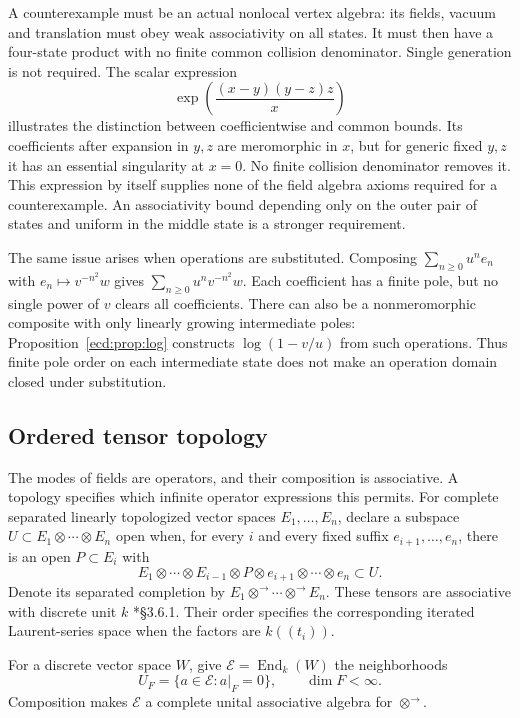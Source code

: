 A counterexample must be an actual nonlocal vertex
algebra: its fields, vacuum and translation must obey
weak associativity on all states. It must then have
a four-state product with no finite common collision
denominator. Single generation is not required.
The scalar expression
\[
 \exp\left(\frac{(x-y)(y-z)z}{x}\right)
\]
illustrates the distinction between coefficientwise
and common bounds. Its coefficients after expansion
in \(y,z\) are meromorphic in \(x\), but for generic
fixed \(y,z\) it has an essential singularity at
\(x=0\). No finite collision denominator removes it.
This expression by itself supplies none of the field
algebra axioms required for a counterexample.
An associativity bound depending only on the outer
pair of states and uniform in the middle state is
a stronger requirement.

The same issue arises when operations are substituted.
Composing \(\sum_{n\geq0}u^ne_n\) with
\(e_n\mapsto v^{-n^2}w\) gives
\(\sum_{n\geq0}u^nv^{-n^2}w\). Each coefficient has
a finite pole, but no single power of \(v\) clears
all coefficients. There can also be a nonmeromorphic
composite with only linearly growing intermediate
poles: Proposition~\ref{ecd:prop:log} constructs
\(\log(1-v/u)\) from such operations. Thus finite
pole order on each intermediate state does not make
an operation domain closed under substitution.

\subsection{Ordered tensor topology}
\label{e1c:sec:topology}

The\label{e1c:def:ordered-tensor-completion} modes of fields are operators, and their
composition is associative. A topology specifies
which infinite operator expressions this permits.
For complete separated linearly topologized vector
spaces \(E_1,\ldots,E_n\), declare a subspace
\(U\subset E_1\otimes\cdots\otimes E_n\) open when,
for every \(i\) and every fixed suffix
\(e_{i+1},\ldots,e_n\), there is an open
\(P\subset E_i\) with
\[
 E_1\otimes\cdots\otimes E_{i-1}\otimes P
              \otimes e_{i+1}\otimes\cdots\otimes e_n
                       \subset U.
\]
Denote its separated completion by
\(E_1\otimes^{\to}\cdots\otimes^{\to}E_n\).
These tensors are associative with discrete unit
\(k\) \cite{chhop:BD}*{\S3.6.1}.
Their order specifies the corresponding iterated
Laurent-series space when the factors are \(k((t_i))\).

\begin{proposition}\label{e1c:prop:operators}
For a discrete vector space \(W\), give
\(\mathcal E=\operatorname{End}_k(W)\) the neighborhoods
\[
 U_F=\{a\in\mathcal E:a|_F=0\},
                      \qquad \dim F<\infty.
\]
Composition makes \(\mathcal E\) a complete unital
associative algebra for \(\otimes^{\to}\).
\end{proposition}

